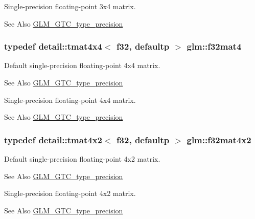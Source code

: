 Single-\/precision floating-\/point 3x4 matrix. \begin{DoxySeeAlso}{See Also}
\hyperlink{group__gtc__type__precision}{G\-L\-M\-\_\-\-G\-T\-C\-\_\-type\-\_\-precision} 
\end{DoxySeeAlso}
\hypertarget{group__gtc__type__precision_ga6bf98d2ab0eb4889e5190c26e1853292}{
\subsubsection[{f32mat4}]{\setlength{\rightskip}{0pt plus 5cm}typedef detail\-::tmat4x4$<$ f32, defaultp $>$ {\bf glm\-::f32mat4}}}\label{group__gtc__type__precision_ga6bf98d2ab0eb4889e5190c26e1853292}
Default single-\/precision floating-\/point 4x4 matrix. \begin{DoxySeeAlso}{See Also}
\hyperlink{group__gtc__type__precision}{G\-L\-M\-\_\-\-G\-T\-C\-\_\-type\-\_\-precision}
\end{DoxySeeAlso}
Single-\/precision floating-\/point 4x4 matrix. \begin{DoxySeeAlso}{See Also}
\hyperlink{group__gtc__type__precision}{G\-L\-M\-\_\-\-G\-T\-C\-\_\-type\-\_\-precision} 
\end{DoxySeeAlso}
\hypertarget{group__gtc__type__precision_ga6aee56c6561190811699bfd2b1cd0d57}{
\subsubsection[{f32mat4x2}]{\setlength{\rightskip}{0pt plus 5cm}typedef detail\-::tmat4x2$<$ f32, defaultp $>$ {\bf glm\-::f32mat4x2}}}\label{group__gtc__type__precision_ga6aee56c6561190811699bfd2b1cd0d57}
Default single-\/precision floating-\/point 4x2 matrix. \begin{DoxySeeAlso}{See Also}
\hyperlink{group__gtc__type__precision}{G\-L\-M\-\_\-\-G\-T\-C\-\_\-type\-\_\-precision}
\end{DoxySeeAlso}
Single-\/precision floating-\/point 4x2 matrix. \begin{DoxySeeAlso}{See Also}
\hyperlink{group__gtc__type__precision}{G\-L\-M\-\_\-\-G\-T\-C\-\_\-type\-\_\-precision} 
\end{DoxySeeAlso}
